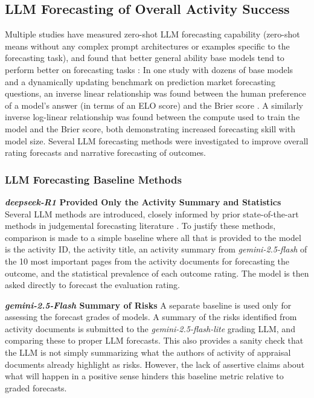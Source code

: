 \documentclass[12pt,a4paper]{article}
\let\citep\parencite
\begin{document}
\subsection{LLM Forecasting of Overall Activity Success}

Multiple studies have measured zero-shot LLM forecasting capability (zero-shot means without any complex prompt architectures or examples specific to the forecasting task), and found that better general ability base models tend to perform better on forecasting tasks \citep{halawiApproachingHumanLevelForecasting2024} \citep{kargerForecastBenchDynamicBenchmark2024}: In one study with dozens of base models and a dynamically updating benchmark on prediction market forecasting questions, an inverse linear relationship was found between the human preference of a model's answer (in terms of an ELO score) and the Brier score \citep{kargerForecastBenchDynamicBenchmark2024}. A similarly inverse log-linear relationship was found between the compute used to train the model and the Brier score, both demonstrating increased forecasting skill with model size.
Several LLM forecasting methods were investigated to improve overall rating forecasts and narrative forecasting of outcomes.

\subsubsection{LLM Forecasting Baseline Methods}
\textbf{\emph{deepseek-R1} Provided Only the Activity Summary and Statistics}
Several LLM methods are introduced, closely informed by prior state-of-the-art methods in judgemental forecasting literature \citep{halawiApproachingHumanLevelForecasting2024} \citep{leeAdvancingEventForecasting2025}. To justify these methods, comparison is made to a simple baseline where all that is provided to the model is the activity ID, the activity title, an activity summary from \emph{gemini-2.5-flash} of the 10 most important pages from the activity documents for forecasting the outcome, and the statistical prevalence of each outcome rating. The model is then asked directly to forecast the evaluation rating.

\textbf{\emph{gemini-2.5-Flash} Summary of Risks}
A separate baseline is used only for assessing the forecast grades of models. A summary of the risks identified from activity documents is submitted to the \emph{gemini-2.5-flash-lite} grading LLM, and comparing these to proper LLM forecasts. This also provides a sanity check that the LLM is not simply summarizing what the authors of activity of appraisal documents already highlight as risks. However, the lack of assertive claims about what will happen in a positive sense hinders this baseline metric relative to graded forecasts.
\end{document}
